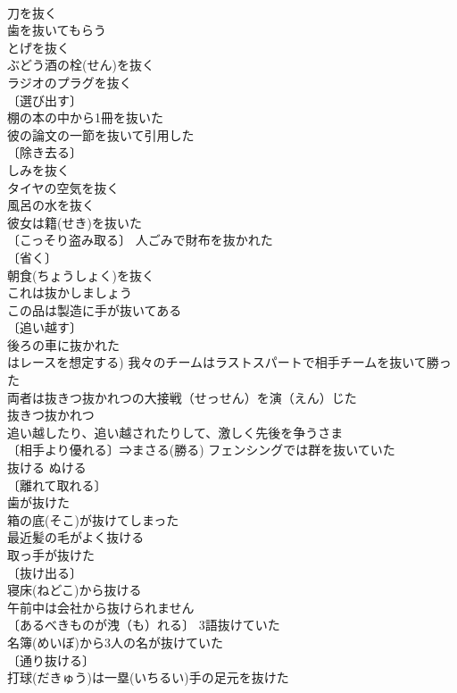 \documentclass[8pt]{extreport}
\begin{document}
\begin{CJK}{UTF8}{min}
\\	刀を抜く 
\\	歯を抜いてもらう 
\\	とげを抜く 
\\	ぶどう酒の栓(せん)を抜く 
\\	ラジオのプラグを抜く 
\\	〔選び出す〕
\\	棚の本の中から1冊を抜いた 
\\	彼の論文の一節を抜いて引用した 
\\	〔除き去る〕
\\	しみを抜く 
\\	タイヤの空気を抜く 
\\	風呂の水を抜く 
\\	彼女は籍(せき)を抜いた 
\\	〔こっそり盗み取る〕 人ごみで財布を抜かれた 
\\	〔省く〕
\\	朝食(ちょうしょく)を抜く 
\\	これは抜かしましょう 
\\	この品は製造に手が抜いてある 
\\	〔追い越す〕
\\	後ろの車に抜かれた 
\\	はレースを想定する) 我々のチームはラストスパートで相手チームを抜いて勝った 
\\	両者は抜きつ抜かれつの大接戦（せっせん）を演（えん）じた 
\\	抜きつ抜かれつ 
\\	追い越したり、追い越されたりして、激しく先後を争うさま 
\\	〔相手より優れる〕⇒まさる(勝る) フェンシングでは群を抜いていた 
\\	抜ける	ぬける	
\\	〔離れて取れる〕
\\	歯が抜けた 
\\	箱の底(そこ)が抜けてしまった 
\\	最近髪の毛がよく抜ける 
\\	取っ手が抜けた 
\\	〔抜け出る〕
\\	寝床(ねどこ)から抜ける 
\\	午前中は会社から抜けられません 
\\	〔あるべきものが洩（も）れる〕 3語抜けていた 
\\	名簿(めいぼ)から3人の名が抜けていた 
\\	〔通り抜ける〕
\\	打球(だきゅう)は一塁(いちるい)手の足元を抜けた 

\end{CJK}
\end{document}
